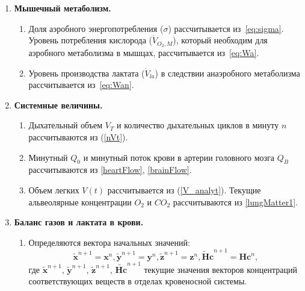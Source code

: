 \begin{enumerate}
	
	\item {\bf Мышечный метаболизм.}

\begin{enumerate}
	
	\item \label{it:iter_start} Доля аэробного энергопотребления ($\sigma$) рассчитывается из~\eqref{eq:sigma}. Уровень потребления кислорода ($\dot{V}_{O_{2},M}$), который необходим для аэробного метаболизма в мышцах, рассчитывается из~\eqref{eq:Wa}. 
	
	\item Уровень производства лактата ($\dot{V}_{la}$) в следствии анаэробного метаболизма рассчитывается из~\eqref{eq:Wan}.
	
\end{enumerate}	

	\item {\bf Системные величины.}

\begin{enumerate}
		
	\item Дыхательный объем $V_{T}$ и количество дыхательных циклов в минуту $n$ рассчитываются из (\ref{nVt}). 
	
	\item Минутный  $Q_{0}$ и минутный поток крови в артерии головного мозга $Q_{B}$ рассчитываются из \eqref{heartFlow}, \eqref{brainFlow}. 
	
	\item Объем легких $V(t)$ рассчитывается из (\ref{V_analyt}). Текущие альвеолярные концентрации $O_{2}$ и $CO_{2}$ рассчитываются из \eqref{lungMatter1}.   

\end{enumerate}

	\item {\bf Баланс газов и лактата в крови.}

\begin{enumerate}	
	
	\item Определяются вектора начальных значений:
	\begin{equation*}
	\tilde{\mathbf{x}}^{n+1} = \mathbf{x}^{n}, \tilde{\mathbf{y}}^{n+1} = \mathbf{y}^{n}, \tilde{\mathbf{z}}^{n+1} = \mathbf{z}^{n}, \mathbf{\tilde{H}c}^{n+1} = \mathbf{Hc}^{n}, 
	\end{equation*}
	где $\tilde{\mathbf{x}}^{n+1}$, $\tilde{\mathbf{y}}^{n+1}$, $\tilde{\mathbf{z}}^{n+1}$, $\tilde{\mathbf{Hc}}^{n+1}$ текущие значения векторов концентраций соответствующих веществ в отделах кровеносной системы.
	

\end{enumerate}
\end{enumerate}
